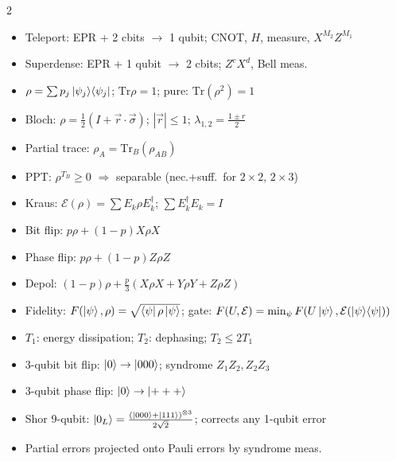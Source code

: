 \documentclass[10pt,a4paper]{article}
\begin{document}
\begin{multicols}{2}
\begin{tcolorbox}[cheatstyle, title={Teleportation \& Superdense}]
\begin{itemize}[nosep,leftmargin=*]
\item Teleport: EPR + 2 cbits $\to$ 1 qubit; CNOT, $H$, measure, $X^{M_2}Z^{M_1}$
\item Superdense: EPR + 1 qubit $\to$ 2 cbits; $Z^cX^d$, Bell meas.
\end{itemize}
\end{tcolorbox}

\begin{tcolorbox}[cheatstyle, title={Density Operator \& Noise}]
\begin{itemize}[nosep,leftmargin=*]
\item $\rho=\sum p_j\ket{\psi_j}\!\bra{\psi_j}$; $\mathrm{Tr}\rho=1$; pure: $\mathrm{Tr}(\rho^2)=1$
\item Bloch: $\rho=\frac{1}{2}(I+\vec{r}\cdot\vec\sigma)$; $|\vec{r}|\le 1$; $\lambda_{1,2}=\frac{1\pm r}{2}$
\item Partial trace: $\rho_A=\mathrm{Tr}_B(\rho_{AB})$
\item PPT: $\rho^{T_B}\ge 0$ $\Rightarrow$ separable (nec.+suff.\ for $2{\times}2$, $2{\times}3$)
\item Kraus: $\mathcal{E}(\rho)=\sum E_k\rho E_k^\dagger$; $\sum E_k^\dagger E_k=I$
\item Bit flip: $p\rho+(1-p)X\rho X$
\item Phase flip: $p\rho+(1-p)Z\rho Z$
\item Depol: $(1-p)\rho+\frac{p}{3}(X\rho X+Y\rho Y+Z\rho Z)$
\item Fidelity: $F(\ket\psi,\rho)=\sqrt{\bra\psi\rho\ket\psi}$; gate: $F(U,\mathcal{E})=\min_\psi F(U\ket\psi,\mathcal{E}(\ket\psi\!\bra\psi))$
\item $T_1$: energy dissipation; $T_2$: dephasing; $T_2\le 2T_1$
\end{itemize}
\end{tcolorbox}

\begin{tcolorbox}[cheatstyle, title={QEC}]
\begin{itemize}[nosep,leftmargin=*]
\item 3-qubit bit flip: $\ket{0}\to\ket{000}$; syndrome $Z_1Z_2,Z_2Z_3$
\item 3-qubit phase flip: $\ket{0}\to\ket{+++}$
\item Shor 9-qubit: $\ket{0_L}=\frac{(\ket{000}+\ket{111})^{\otimes 3}}{2\sqrt{2}}$; corrects any 1-qubit error
\item Partial errors projected onto Pauli errors by syndrome meas.
\end{itemize}
\end{tcolorbox}


\end{multicols}
\end{document}
